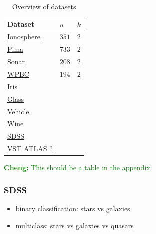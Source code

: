 \documentclass[fleqn,10pt,lineno]{wlpeerj} %
\newcommand{\cheng}[1]{\textcolor{green}{\textbf{Cheng: }{\footnotesize #1}}}
\begin{document}
\begin{table}[h]
	\caption {Overview of datasets} \label{tab:datasets}
	\centering
	\begin{tabular}{lll}
		\toprule
		{Dataset}  & $n$ &  $k$  \\
		\midrule
		\href{https://archive.ics.uci.edu/ml/datasets/Ionosphere}{Ionosphere}
        	& $351$ & $2$ \\
		\href{https://archive.ics.uci.edu/ml/datasets/Pima+Indians+Diabetes}{Pima}
        	& $733$ & $2$ \\
		\href{https://archive.ics.uci.edu/ml/datasets/Connectionist+Bench+(Sonar,+Mines+vs.+Rocks)}{Sonar}
        	& $208$ & $2$ \\
		\href{https://archive.ics.uci.edu/ml/datasets/Breast+Cancer+Wisconsin+(Prognostic)}{WPBC}
        	& $194$ & $2$ \\
        \href{https://archive.ics.uci.edu/ml/datasets/Breast+Cancer+Wisconsin+(Prognostic)}{Iris}
        	& $ $ & $ $ \\
        \href{https://archive.ics.uci.edu/ml/datasets/Glass+Identification}{Glass}
        	& $ $ & $ $ \\
        \href{https://archive.ics.uci.edu/ml/datasets/Statlog+(Vehicle+Silhouettes)}{Vehicle}
        	& $ $ & $ $ \\
        \href{https://archive.ics.uci.edu/ml/datasets/Wine}{Wine}
        	& $ $ & $ $ \\
        \href{}{SDSS}
        	& $ $ & $ $ \\
        \href{}{VST ATLAS ?}
        	& $ $ & $ $ \\
		\bottomrule
	\end{tabular}
\end{table}

\cheng{This should be a table in the appendix.}


\subsubsection*{SDSS}

\begin{itemize}
  \item binary classification: stars vs galaxies
  \item multiclass: stars vs galaxies vs quasars
\end{itemize}
\end{document}
